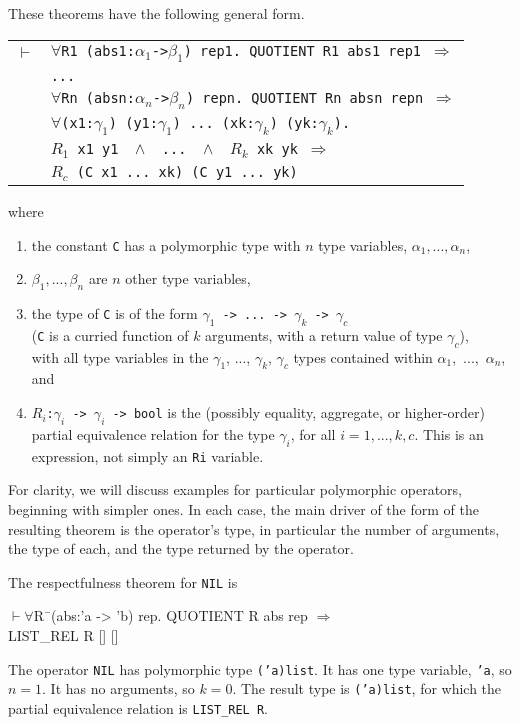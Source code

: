 \documentclass[envcountsame,runningheads]{llncs}
\newcommand{\quotient}{partial equivalence}
\begin{document}
These theorems have the following general form.
\begin{center}
\begin{tabular}{rl}
$\vdash$
& {\tt $\forall$R1 (abs1:$\alpha_1$->$\beta_1$) rep1. QUOTIENT R1 abs1 rep1 $\Rightarrow$} \\
& {\tt ...} \\
& {\tt $\forall$Rn (absn:$\alpha_n$->$\beta_n$) repn. QUOTIENT Rn absn repn $\Rightarrow$} \\
& {\tt $\forall$(x1:$\gamma_1$) (y1:$\gamma_1$) ... (xk:$\gamma_k$) (yk:$\gamma_k$).}
\\
& \hspace{12mm}
{\tt $R_1$ x1 y1 \
$\wedge$ \ 
... \
$\wedge$ \ 
$R_k$ xk yk $\Rightarrow$
}  \\
& \hspace{12mm}
{\tt $R_c$ (C x1 ... xk) (C y1 ... yk)}  \\
\end{tabular}
\end{center}
where
\begin{enumerate}
\item
the constant {\tt C} has a polymorphic type with $n$ type variables,
$\alpha_1, ..., \alpha_n$,
\item
$\beta_1, ..., \beta_n$ are $n$ other type variables,
\item
the type of {\tt C} is of the form
{\tt $\gamma_1$ -> ... -> $\gamma_k$ -> $\gamma_c$} \\
({\tt C} is a curried function of $k$ arguments, with a return value of
type $\gamma_c$), \\
with
all type variables in the $\gamma_1$, ..., $\gamma_k$, $\gamma_c$ types
contained within $\alpha_1$,~...,~$\alpha_n$,
and
\item
{\tt $R_i$:$\gamma_i$ -> $\gamma_i$ -> bool}
is the (possibly equality, aggregate, or higher-order)
\quotient{} relation
for the type $\gamma_i$, for all $i=1,...,k,c$.
This is an expression, not simply an
{\tt Ri} variable.
\end{enumerate}

For clarity, we will discuss examples for particular polymorphic
operators, beginning with simpler ones.  In each case, the main driver
of the form of the resulting theorem is the operator's type, 
in particular the number of arguments, the type of each, and the type
returned by the operator.

\pagebreak[3]
The respectfulness theorem for {\tt NIL} is
{\tt \begin{tabbing}
\hspace{5.5mm}
    $\vdash \forall$R\=\ (abs:'a -> 'b) rep. QUOTIENT R abs rep $\Rightarrow$ \\
\>       LIST\_REL R [] []
\end{tabbing}}
The operator {\tt NIL} has polymorphic type {\tt ('a)list}. 
It has one type variable, {\tt 'a}, so $n = 1$. 
It has no arguments, so $k = 0$.
The result type is
{\tt ('a)list},
for which
the \quotient{} relation
is {\tt LIST\_REL R}.
\end{document}
